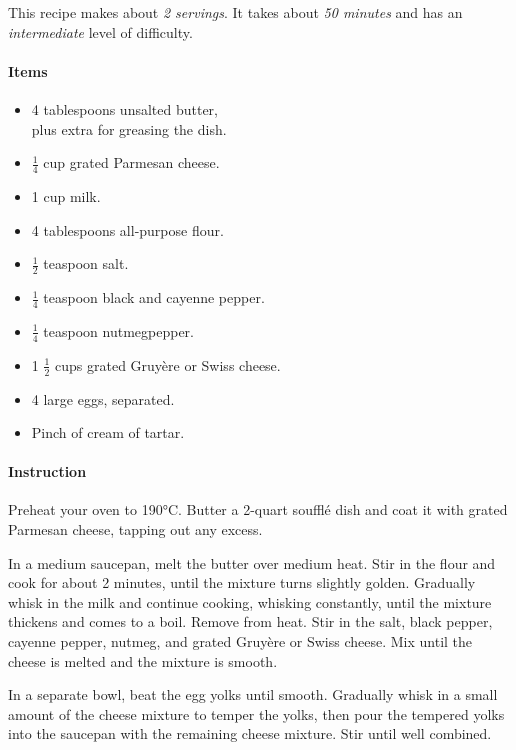 This recipe makes about \emph{2 servings}. It takes about \emph{50 minutes} and has an \emph{intermediate} level of difficulty. 

\paragraph{Items}
\begin{itemize}[noitemsep]
	\item[\ding{182}] 4 tablespoons unsalted butter, \\ plus extra for greasing the dish.
	\item[\ding{183}] $\frac{1}{4}$ cup grated Parmesan cheese.
	\item[\ding{184}] 1 cup milk.
	\item[\ding{185}] 4 tablespoons all-purpose flour.
	\item[\ding{186}] $\frac{1}{2}$ teaspoon salt.
	\item[\ding{187}] $\frac{1}{4}$ teaspoon black and cayenne pepper.
	\item[\ding{188}] $\frac{1}{4}$ teaspoon nutmegpepper.
	\item[\ding{189}] 1 $\frac{1}{2}$ cups grated Gruyère or Swiss cheese.
	\item[\ding{190}] 4 large eggs, separated.
	\item[\ding{191}] Pinch of cream of tartar.	
\end{itemize}

\paragraph{Instruction} Preheat your oven to 190°C. Butter a 2-quart soufflé dish and coat it with grated Parmesan cheese, tapping out any excess.

In a medium saucepan, melt the butter over medium heat. Stir in the flour and cook for about 2 minutes, until the mixture turns slightly golden. Gradually whisk in the milk and continue cooking, whisking constantly, until the mixture thickens and comes to a boil. Remove from heat. Stir in the salt, black pepper, cayenne pepper, nutmeg, and grated Gruyère or Swiss cheese. Mix until the cheese is melted and the mixture is smooth.

In a separate bowl, beat the egg yolks until smooth. Gradually whisk in a small amount of the cheese mixture to temper the yolks, then pour the tempered yolks into the saucepan with the remaining cheese mixture. Stir until well combined.

